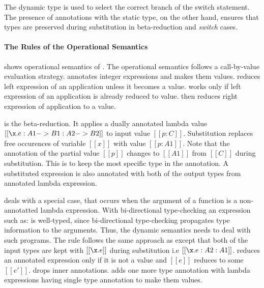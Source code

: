 
The dynamic type is used to select the correct branch of the switch statement.
The presence of annotations with the static type, on the other hand,
ensures that types are preserved during substitution in
beta-reduction and \emph{switch} cases.

\paragraph{The Rules of the Operational Semantics}
 shows operational semantics of \cal.
The operational semantics follows a call-by-value evaluation strategy.
 annotates integer expressions and makes them
values.  reduces left expression of an application
unless it becomes a value.  works only if left
expression of an application is already reduced to
value.  then reduces right expression of application
to a value.

 is the beta-reduction. It applies a dually
annotated lambda value $[[\x.e : A1 -> B1 : A2 -> B2]]$ to input
value $[[p:C]]$. Substitution replaces free occurences of variable
$[[x]]$ with value $[[p:A1]]$. Note that the annotation of the partial value
$[[p]]$ changes to $[[A1]]$ from $[[C]]$ during substitution.
This is to keep the most specific type in the annotation. A substituted
expression is also annotated with both of the output types from
annotated lambda expression. 

 deals with a special case, that occurs when the
argument of a function is a non-annotatted lambda expression.
With bi-directional type-checking an expression such as:
is well-typed, since bi-directional type-checking propagates
type information to the arguments. Thus, the dynamic semantics
needs to deal with such programs.
The rule follows the same approach as
 except that both of the input types are kept with
$[[\x.e]]$ during substitution i.e $[[\x.e:A2:A1]]$. 
reduces an annotated expression only if it is not a value and $[[e]]$
reduces to some $[[e']]$.  drops inner
annotations.  adds one more type annotation with
lambda expressions having single type annotation to make them values.

